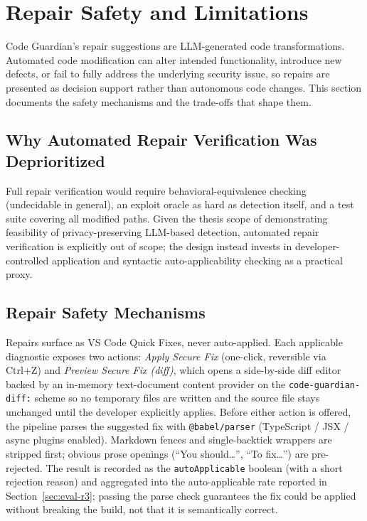 \section{Repair Safety and Limitations}
\label{sec:impl-repair-safety}

Code Guardian's repair suggestions are LLM-generated code transformations. Automated code modification can alter intended functionality, introduce new defects, or fail to fully address the underlying security issue, so repairs are presented as decision support rather than autonomous code changes. This section documents the safety mechanisms and the trade-offs that shape them.

\subsection{Why Automated Repair Verification Was Deprioritized}

Full repair verification would require behavioral-equivalence checking (undecidable in general), an exploit oracle as hard as detection itself, and a test suite covering all modified paths. Given the thesis scope of demonstrating feasibility of privacy-preserving LLM-based detection, automated repair verification is explicitly out of scope; the design instead invests in developer-controlled application and syntactic auto-applicability checking as a practical proxy.

\subsection{Repair Safety Mechanisms}

Repairs surface as VS Code Quick Fixes, never auto-applied. Each applicable diagnostic exposes two actions: \emph{Apply Secure Fix} (one-click, reversible via Ctrl+Z) and \emph{Preview Secure Fix (diff)}, which opens a side-by-side diff editor backed by an in-memory text-document content provider on the \texttt{code-guardian-diff:} scheme so no temporary files are written and the source file stays unchanged until the developer explicitly applies. Before either action is offered, the pipeline parses the suggested fix with \texttt{@babel/parser} (TypeScript / JSX / async plugins enabled). Markdown fences and single-backtick wrappers are stripped first; obvious prose openings (``You should\dots'', ``To fix\dots'') are pre-rejected. The result is recorded as the \texttt{autoApplicable} boolean (with a short rejection reason) and aggregated into the auto-applicable rate reported in Section~\ref{sec:eval-r3}; passing the parse check guarantees the fix could be applied without breaking the build, not that it is semantically correct.

